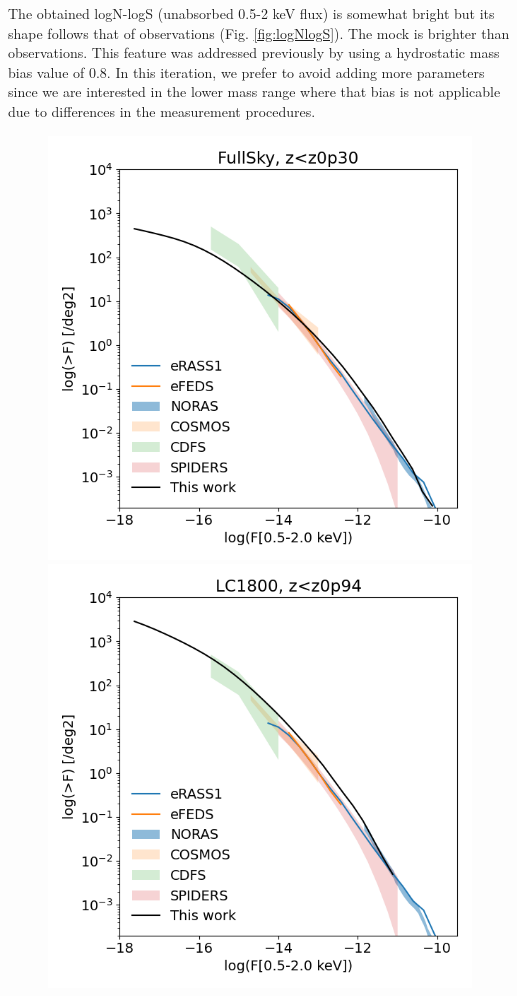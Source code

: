 \documentclass[twocolumn,iop]{openjournal}
\begin{document}
The obtained logN-logS (unabsorbed 0.5-2 keV flux) is somewhat bright but its shape follows that of observations (Fig. \ref{fig:logNlogS}). The mock is brighter than observations. This feature was addressed previously by using a hydrostatic mass bias value of 0.8. 
In this iteration, we prefer to avoid adding more parameters since we are interested in the lower mass range where that bias is not applicable due to differences in the measurement procedures. 

\begin{figure}
    \centering
    \includegraphics[width=0.8\linewidth]{figures_GAS/FullSky_zlt_z0p30_logNlogS.png}
    \includegraphics[width=0.8\linewidth]{figures_GAS/LC1800_zlt_z0p94_logNlogS.png}

\end{figure}
\end{document}

